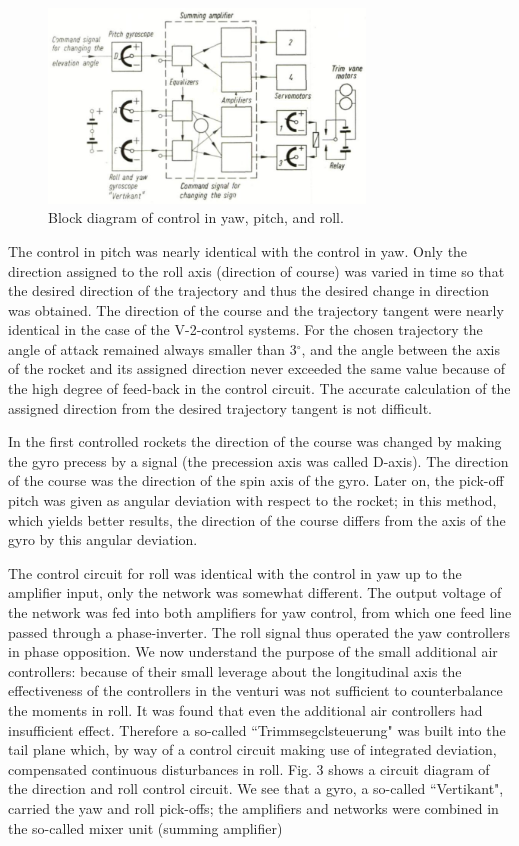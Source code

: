 \documentclass[12pt, a4paper]{article}
\begin{document}
\begin{figure}[ht]
  \centering
  \includegraphics[width=0.75\textwidth]{figs/ctrl-03.png}
  \caption{Block diagram of control in yaw, pitch, and roll.}
  \label{fig:03}
\end{figure}

The control in pitch was nearly identical with the control in yaw. Only the direction assigned to the roll axis (direction of course) was varied in time so that the desired direction of the trajectory and thus the desired change in direction was obtained. The direction of the course and the trajectory tangent were nearly identical in the case of the V-2-control systems. For the chosen trajectory the angle of attack remained always smaller than 3$^\circ$, and the angle between the axis of the rocket and its assigned direction never exceeded the same value because of the high degree of feed-back in the control circuit. The accurate calculation of the assigned direction from the desired trajectory tangent is not difficult.

In the first controlled rockets the direction of the course was changed by making the gyro precess by a signal (the precession axis was called D-axis). The direction of the course was the direction of the spin axis of the gyro. Later on, the pick-off pitch was given as angular deviation with respect to the rocket; in this method, which yields better results, the direction of the course differs from the axis of the gyro by this angular deviation.

The control circuit for roll was identical with the control in yaw up to the amplifier input, only the network was somewhat different. The output voltage of the network was fed into both amplifiers for yaw control, from which one feed line passed through a phase-inverter. The roll signal thus operated the yaw controllers in phase opposition. We now understand the purpose of the small additional air controllers: because of their small leverage about the longitudinal axis the effectiveness of the controllers in the venturi was not sufficient to counterbalance the moments in roll. It was found that even the additional air controllers had insufficient effect. Therefore a so-called ``Trimmsegclsteuerung" was built into the tail plane which, by way of a control circuit making use of integrated deviation, compensated continuous disturbances in roll. Fig. 3 shows a circuit diagram of the direction and roll control circuit. We see that a gyro, a so-called ``Vertikant", carried the yaw and roll pick-offs; the amplifiers and networks were combined in the so-called mixer unit (summing amplifier)
\end{document}
